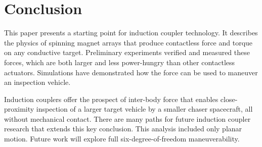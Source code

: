 \section{Conclusion}
This paper presents a starting point for induction coupler technology. It describes the physics of spinning magnet arrays that produce contactless force and torque on any conductive target. Preliminary experiments verified and measured these forces, which are both larger and less power-hungry than other contactless actuators. Simulations have demonstrated how the force can be used to maneuver an inspection vehicle. 

Induction couplers offer the prospect of inter-body force that enables close-proximity inspection of a larger target vehicle by a smaller chaser spacecraft, all without mechanical contact. There are many paths for future induction coupler research that extends this key conclusion. This analysis included only planar motion. Future work will explore full six-degree-of-freedom maneuverability.
